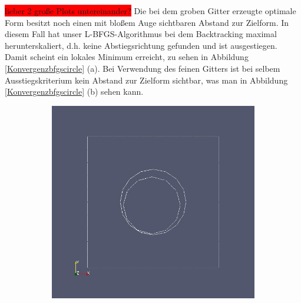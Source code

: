 \colorbox{red}{lieber 2 große Plots untereinander?}
Die bei dem groben Gitter erzeugte optimale Form besitzt noch einen mit bloßem Auge sichtbaren Abstand zur Zielform. In diesem Fall hat unser L-BFGS-Algorithmus bei dem Backtracking maximal herunterskaliert, d.h. keine Abstiegsrichtung gefunden und ist ausgestiegen. Damit scheint ein lokales Minimum erreicht, zu sehen in Abbildung  \ref{Konvergenzbfgscircle} (a). Bei Verwendung des feinen Gitters ist bei selbem Ausstiegskriterium kein Abstand zur Zielform sichtbar, was man in Abbildung \ref{Konvergenzbfgscircle} (b) sehen kann.

\begin{figure}
	\begin{subfigure}{0.5\textwidth}
	\centering
	\includegraphics[scale=0.25]{pic_bigcircle_bfgs_linesearch.jpg}
	\caption{}	
	\end{subfigure}
	\begin{subfigure}{0.5\textwidth}
	\centering

\end{subfigure}
\end{figure}
